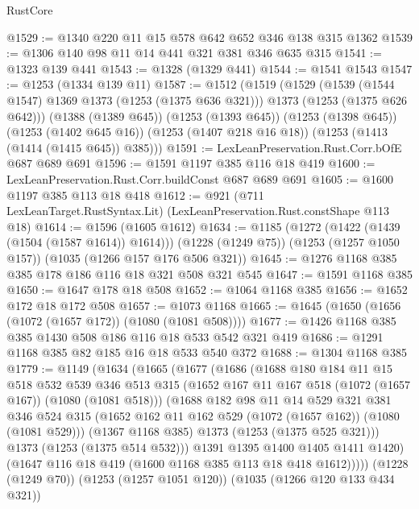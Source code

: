 \begin{lexlean}{RustCore}
\begin{coremodule}
@1529 := @1340 @220 @11 @15 @578 @642 @652 @346 @138 @315 @1362
@1539 := @1306 @140 @98 @11 @14 @441 @321 @381 @346 @635 @315
@1541 := @1323 @139 @441
@1543 := @1328 (@1329 @441)
@1544 := @1541 @1543
@1547 := @1253 (@1334 @139 @11)
@1587 := @1512
    (@1519
      (@1529
        (@1539 (@1544 @1547) @1369 @1373 (@1253 (@1375 @636 @321)))
        @1373
        (@1253 (@1375 @626 @642)))
      (@1388 (@1389 @645))
      (@1253 (@1393 @645))
      (@1253 (@1398 @645))
      (@1253 (@1402 @645 @16))
      (@1253 (@1407 @218 @16 @18))
      (@1253 (@1413 (@1414 (@1415 @645)) @385)))
@1591 := LexLeanPreservation.Rust.Corr.bOfE @687 @689 @691
@1596 := @1591 @1197 @385 @116 @18 @419
@1600 := LexLeanPreservation.Rust.Corr.buildConst @687 @689 @691
@1605 := @1600 @1197 @385 @113 @18 @418
@1612 := @921 (@711 LexLeanTarget.RustSyntax.Lit) (LexLeanPreservation.Rust.constShape @113 @18)
@1614 := @1596 (@1605 @1612)
@1634 := @1185
    (@1272 (@1422 (@1439 (@1504 (@1587 @1614)) @1614)))
    (@1228 (@1249 @75))
    (@1253 (@1257 @1050 @157))
    (@1035 (@1266 @157 @176 @506 @321))
@1645 := @1276 @1168 @385 @385 @178 @186 @116 @18 @321 @508 @321 @545
@1647 := @1591 @1168 @385
@1650 := @1647 @178 @18 @508
@1652 := @1064 @1168 @385
@1656 := @1652 @172 @18 @172 @508
@1657 := @1073 @1168
@1665 := @1645 (@1650 (@1656 (@1072 (@1657 @172)) (@1080 (@1081 @508))))
@1677 := @1426 @1168 @385 @385 @1430 @508 @186 @116 @18 @533 @542 @321 @419
@1686 := @1291 @1168 @385 @82 @185 @16 @18 @533 @540 @372
@1688 := @1304 @1168 @385
@1779 := @1149
    (@1634
      (@1665
        (@1677
          (@1686
            (@1688
              @180
              @184
              @11
              @15
              @518
              @532
              @539
              @346
              @513
              @315
              (@1652 @167 @11 @167 @518 (@1072 (@1657 @167)) (@1080 (@1081 @518)))
              (@1688
                @182
                @98
                @11
                @14
                @529
                @321
                @381
                @346
                @524
                @315
                (@1652 @162 @11 @162 @529 (@1072 (@1657 @162)) (@1080 (@1081 @529)))
                (@1367 @1168 @385)
                @1373
                (@1253 (@1375 @525 @321)))
              @1373
              (@1253 (@1375 @514 @532)))
            @1391
            @1395
            @1400
            @1405
            @1411
            @1420)
          (@1647 @116 @18 @419 (@1600 @1168 @385 @113 @18 @418 @1612)))))
    (@1228 (@1249 @70))
    (@1253 (@1257 @1051 @120))
    (@1035 (@1266 @120 @133 @434 @321))

\end{coremodule}
\end{lexlean}
